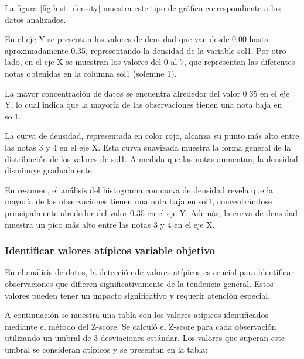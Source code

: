 La figura \ref{fig:hist_density} muestra este tipo de gráfico correspondiente a los datos analizados.

En el eje Y se presentan los valores de densidad que van desde 0.00 hasta aproximadamente 0.35, representando la densidad de la variable sol1. Por otro lado, en el eje X se muestran los valores del 0 al 7, que representan las diferentes notas obtenidas en la columna sol1 (solemne 1).

La mayor concentración de datos se encuentra alrededor del valor 0.35 en el eje Y, lo cual indica que la mayoría de las observaciones tienen una nota baja en sol1.

La curva de densidad, representada en color rojo, alcanza su punto más alto entre las notas 3 y 4 en el eje X. Esta curva suavizada muestra la forma general de la distribución de los valores de sol1. A medida que las notas aumentan, la densidad disminuye gradualmente.

En resumen, el análisis del histograma con curva de densidad revela que la mayoría de las observaciones tienen una nota baja en sol1, concentrándose principalmente alrededor del valor 0.35 en el eje Y. Además, la curva de densidad muestra un pico más alto entre las notas 3 y 4 en el eje X.

\subsubsection{Identificar valores atípicos variable objetivo}

En el análisis de datos, la detección de valores atípicos es crucial para identificar observaciones que difieren significativamente de la tendencia general. Estos valores pueden tener un impacto significativo y requerir atención especial.

A continuación se muestra una tabla con los valores atípicos identificados mediante el método del Z-score. Se calculó el Z-score para cada observación utilizando un umbral de 3 desviaciones estándar. Los valores que superan este umbral se consideran atípicos y se presentan en la tabla:

